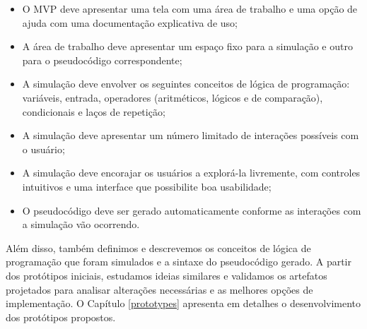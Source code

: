 \begin{itemize}
    \item O MVP deve apresentar uma tela com uma área de trabalho e uma opção de ajuda com uma documentação explicativa de uso;
    \item A área de trabalho deve apresentar um espaço fixo para a simulação e outro para o pseudocódigo correspondente;
    \item A simulação deve envolver os seguintes conceitos de lógica de programação: variáveis, entrada, operadores (aritméticos, lógicos e de comparação), condicionais e laços de repetição;
    \item A simulação deve apresentar um número limitado de interações possíveis com o usuário;
    \item A simulação deve encorajar os usuários a explorá-la livremente, com controles intuitivos e uma interface que possibilite boa usabilidade;
    \item O pseudocódigo deve ser gerado automaticamente conforme as interações com a simulação vão ocorrendo.
\end{itemize}

Além disso, também definimos e descrevemos os conceitos de lógica de programação que foram simulados e a sintaxe do pseudocódigo gerado. A partir dos protótipos iniciais, estudamos ideias similares e validamos os artefatos projetados para analisar alterações necessárias e as melhores opções de implementação. O Capítulo \ref{prototypes} apresenta em detalhes o desenvolvimento dos protótipos propostos.




